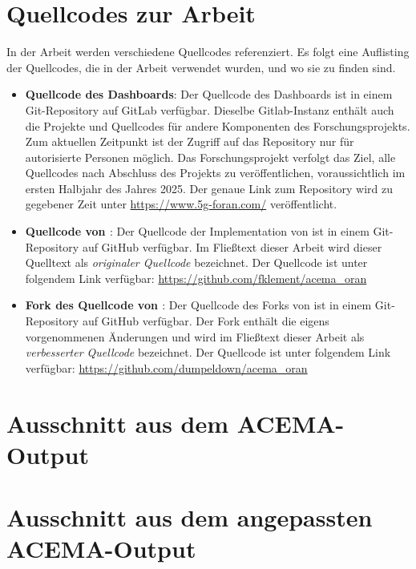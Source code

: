 \chapter{Quellcodes zur Arbeit}
\label{app:sourcecode}
In der Arbeit werden verschiedene Quellcodes referenziert. Es folgt eine Auflisting der Quellcodes, die in der Arbeit verwendet wurden, und wo sie zu finden sind.
\begin{itemize}
    \item \textbf{Quellcode des Dashboards}: Der Quellcode des Dashboards ist in einem Git-Repository auf GitLab verfügbar. Dieselbe Gitlab-Instanz enthält auch die Projekte und Quellcodes für andere Komponenten des Forschungsprojekts. Zum aktuellen Zeitpunkt ist der Zugriff auf das Repository nur für autorisierte Personen möglich. Das Forschungsprojekt verfolgt das Ziel, alle Quellcodes nach Abschluss des Projekts zu veröffentlichen, voraussichtlich im ersten Halbjahr des Jahres 2025. Der genaue Link zum Repository wird zu gegebener Zeit unter \url{https://www.5g-foran.com/} veröffentlicht.
    \item \textbf{Quellcode von \citeauthor{klementSecuring6GTransition2024}}: Der Quellcode der Implementation von \citeauthor{klementSecuring6GTransition2024} ist in einem Git-Repository auf GitHub verfügbar. Im Fließtext dieser Arbeit wird dieser Quelltext als \textit{originaler Quellcode} bezeichnet. Der Quellcode ist unter folgendem Link verfügbar: \url{https://github.com/fklement/acema_oran}
    \item \textbf{Fork des Quellcode von \citeauthor{klementSecuring6GTransition2024}}: Der Quellcode des Forks von \citeauthor{klementSecuring6GTransition2024} ist in einem Git-Repository auf GitHub verfügbar. Der Fork enthält die eigens vorgenommenen Änderungen und wird im Fließtext dieser Arbeit als \textit{verbesserter Quellcode} bezeichnet. Der Quellcode ist unter folgendem Link verfügbar: \url{https://github.com/dumpeldown/acema_oran}
\end{itemize}


\chapter{Ausschnitt aus dem ACEMA-Output}
\label{app:acema-output}

\restoregeometry
\chapter{Ausschnitt aus dem angepassten ACEMA-Output}
\label{app:acema-output-small}

\restoregeometry

